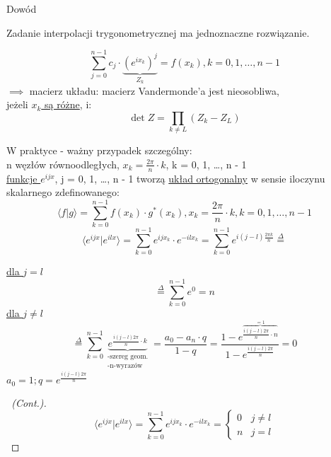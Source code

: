 \begin{frame}[allowframebreaks]{Dowód}
	\begin{theorem}
		Zadanie interpolacji trygonometrycznej ma jednoznaczne rozwiązanie.
	\end{theorem}
	\begin{proofs}
		\[
			\sum\limits_{j = 0}^{n-1} c_j \cdot \underbrace{(e^{ix_k})^j}_{Z_k} = f(x_k), k = 0, 1, \dots, n-1
			\tag{16.13}
		\]
		$\implies$ macierz układu: macierz Vandermonde'a jest nieosobliwa, \\ jeżeli \underline{$x_k$ są różne}, i:
		\[
			\det Z = \prod_{k \neq L} (Z_k - Z_L)
			\tag{16.14}
		\]
	\end{proofs}
	\begin{proofs}
		W praktyce - ważny przypadek szczególny: \\
		n węzłów równoodległych, \underline{$x_k = \frac{2\pi}{n}\cdot k$}, k = 0, 1, \dots, n - 1 \\
		\underline{funkcje $e^{ijx}$}, j = 0, 1, \dots, n - 1 tworzą \underline{układ ortogonalny} w sensie iloczynu skalarnego zdefinowanego: \\
		\[
			\langle f|g \rangle = \sum\limits_{k = 0}^{n-1} f(x_k) \cdot g^* (x_k), x_k = \frac{2\pi}{n} \cdot k, k = 0, 1, \dots, n-1
			\tag{16.15}
		\]
		\[
			\langle e^{ijx}|e^{ilx} \rangle = \sum\limits_{k = 0}^{n-1} e^{ijx_k}  \cdot e^{-ilx_k} = \sum\limits_{k = 0}^{n-1} e^{i(j - l) \frac{2\pi k}{n}}\stackrel{\Delta}{=}
			\tag{16.16}
		\]
	\end{proofs}
	\begin{proofs}
		\underline{dla $j = l$}
		\[
			\stackrel{\Delta}{=} \sum\limits_{k = 0}^{n-1} e^0 = n
			\tag{16.17}
		\]
		\underline{dla $j \neq l$}
		\[
			\stackrel{\Delta}{=} \sum\limits_{k = 0}^{n-1} \underbrace{e^{\frac{i(j - l)2\pi}{n} \cdot k}}_{\substack{
				\text{-szereg geom.} \\
				\text{-n-wyrazów}
			}} = \frac{a_0 - a_n \cdot q}{1 - q} = \frac{1 - e ^{\overbrace{\frac{i(j - l)2\pi}{n} \cdot n}^{=1}}}{1 - e^{\frac{i(j -  l)2\pi}{n}}} = 0
			\tag{16.18}
		\]
		$a_0 = 1; q = e^{\frac{i(j -  l)2\pi}{n}}$
	\end{proofs}
	\begin{proof}[\proofname\ (Cont.)]
		\[
			\langle e^{ijx}|e^{ilx} \rangle = \sum\limits_{k = 0}^{n - 1}e^{ijx_k}  \cdot e^{-ilx_k} = 
			\begin{cases}
				0 & j \neq l \\
				n & j = l
			\end{cases}
			\tag{16.19}
		\]
	\end{proof}
\end{frame}
